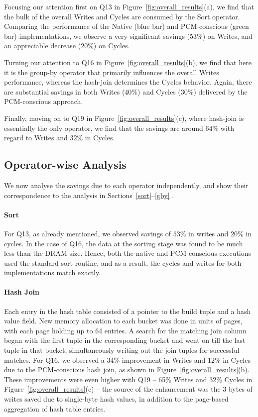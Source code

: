 Focusing our attention first on Q13 in
Figure~\ref{fig:overall_results}(a), we find that the bulk of the
overall Writes and Cycles are consumed by the Sort operator. Comparing
the performance of the Native (blue bar) and PCM-conscious (green bar)
implementations, we observe a very significant savings (53\%) on Writes,
and an appreciable decrease (20\%) on Cycles.

Turning our attention to Q16 in Figure~\ref{fig:overall_results}(b),
we find that here it is the group-by operator that primarily influences
the overall Writes performance, whereas the hash-join determines the
Cycles behavior. Again, there are substantial savings in both Writes
(40\%) and  Cycles (30\%) delivered by the PCM-conscious approach.

Finally, moving on to Q19 in Figure~\ref{fig:overall_results}(c),
where hash-join is essentially the only operator, we find that the
savings are around $64\%$ with regard to Writes and $32\%$ in Cycles.

\subsection{Operator-wise Analysis}
We now analyse the savings due to each operator independently, and show
their correspondence to the analysis in Sections~\ref{sort}--\ref{gby} .

\paragraph{Sort}
For Q13, as already mentioned, we observed savings of $53\%$ in writes and
$20\%$ in cycles.  In the case of Q16, the data at the sorting stage was
found to be much less than the DRAM size. Hence, both the native and
PCM-conscious executions used the standard sort routine, and as a result,
the cycles and writes for both implementations match exactly.

\paragraph{Hash Join}
Each entry in the hash table consisted of a pointer to the build tuple
and a hash value field. New memory allocation to each bucket was done
in units of pages, with each page holding up to 64 entries. A search for
the matching join column began with the first tuple in the corresponding
bucket and went on till the last tuple in that bucket, simultaneously
writing out the join tuples for successful matches.  For Q16, we
observed a $34\%$ improvement in Writes and $12\%$ in Cycles due to the
PCM-conscious hash join, as shown in Figure~\ref{fig:overall_results}(b).
These improvements were even higher with Q19  -- 65\% Writes and 32\%
Cycles in Figure~\ref{fig:overall_results}(c) -- the source of the
enhancement was the 3 bytes of writes saved due to single-byte hash
values, in addition to the page-based aggregation of hash table entries.


